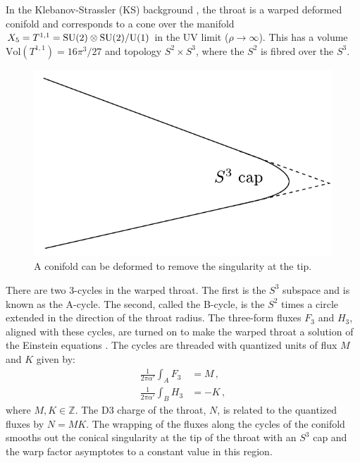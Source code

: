 
In the Klebanov-Strassler (KS) background \cite{ks}, the throat 
is a warped deformed conifold and 
corresponds to a cone over the manifold 
$X_5 = T^{1,1}= {\rm SU(2)} \otimes {\rm SU(2)}/{\rm U(1)}$
in the UV limit ($\rho \rightarrow \infty$). This has   
a volume $\mathrm{Vol} (T^{1,1}) = 16\pi^3/27$ and  topology
$S^2\times S^3$, where the $S^2$ is fibred over the $S^3$.

\begin{figure}[htbp]
\centering
\includegraphics{dbi/graphs/deformed-conifold}   
\caption[Deformed Conifold]{A conifold can be deformed to remove the singularity at
the tip.}
\label{fig:conifold-dbiintro}
\end{figure}

There are two 3-cycles in the warped throat. The first is the $S^3$ subspace and
is known as the A-cycle. The second, called the B-cycle, is the $S^2$ times a
circle extended in the direction of the throat radius. The three-form fluxes
$F_3$ and $H_3$, aligned with these cycles, are turned on to make the warped
throat a solution of the Einstein equations \cite{cline}. The cycles are threaded with
quantized units of flux $M$ and $K$ given by: 
\begin{align}
\label{eq:fluxdefn-dbiintro}
 \frac{1}{2\pi\alpha'}\int_A F_3 &= M \,, \\
 \frac{1}{2\pi\alpha'}\int_B H_3 &= -K\,, 
\end{align}
where $M,K\in \mathbb{Z}$.
The D$3$ charge of the throat, $N$, is related to the quantized fluxes by
$N=MK$.
The wrapping of the fluxes along the cycles of the conifold smooths out the
conical singularity at the tip of the throat with an $S^3$ cap 
\cite{ks,kt} and the warp factor asymptotes to 
a constant value in this region.


